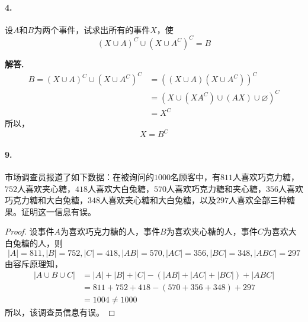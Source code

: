 \documentclass[12pt, a4paper, oneside]{ctexart}
\newenvironment{solution}{\par\noindent\textbf{解答. }}{\bigskip\par}
\begin{document}
\paragraph{4.} 设$A$和$B$为两个事件，试求出所有的事件$X$，使
\begin{equation*}
    (X\cup A)^C\cup(X\cup A^C)^C=B
\end{equation*}
\begin{solution}
    \begin{equation*}
        \begin{aligned}
            B=(X\cup A)^C\cup(X\cup A^C)^C&=((X\cup A)(X\cup A^C))^C\\
            &=(X\cup(XA^C)\cup(AX)\cup\varnothing)^C\\
            &=X^C
        \end{aligned}
    \end{equation*}
    所以，
    \begin{equation*}
        X=B^C
    \end{equation*}
\end{solution}

\paragraph{9.}市场调查员报道了如下数据：在被询问的$1000$名顾客中，有$811$人喜欢巧克力糖，$752$人喜欢夹心糖，$418$人喜欢大白兔糖，$570$人喜欢巧克力糖和夹心糖，$356$人喜欢巧克力糖和大白兔糖，$348$人喜欢夹心糖和大白兔糖，以及$297$人喜欢全部三种糖果。证明这一信息有误。
\begin{proof}
    设事件$A$为喜欢巧克力糖的人，事件$B$为喜欢夹心糖的人，事件$C$为喜欢大白兔糖的人，则
    \begin{equation*}
        |A|=811,|B|=752,|C|=418,|AB|=570,|AC|=356,|BC|=348,|ABC| = 297
    \end{equation*}
    由容斥原理知，
    \begin{equation*}
        \begin{aligned}
            |A\cup B\cup C| &= |A|+|B|+|C|-(|AB|+|AC|+|BC|)+|ABC|\\
            &= 811+752+418-(570+356+348)+297\\
            &= 1004\neq 1000
        \end{aligned}
    \end{equation*}
    所以，该调查员信息有误。
\end{proof}
\end{document}
